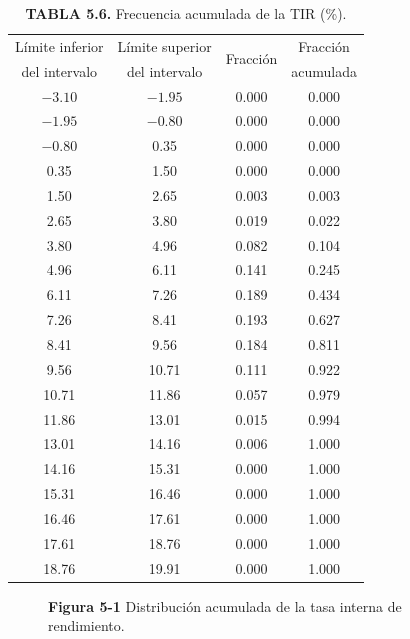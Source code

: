 \documentclass[11pt,letterpaper]{report}
\begin{document}
\begin{table}[H]
\centering
\caption*{\textbf{TABLA 5.6.} Frecuencia acumulada de la TIR (\%).}
\begin{tabular}{cccc}
\toprule
Límite inferior & Límite superior & \multirow{2}{*}{Fracción} & Fracción \\
del intervalo & del intervalo & & acumulada \\
\midrule
$-3.10$ & $-1.95$ & 0.000 & 0.000 \\
$-1.95$ & $-0.80$ & 0.000 & 0.000 \\
$-0.80$ &   0.35  & 0.000 & 0.000 \\
  0.35  &   1.50  & 0.000 & 0.000 \\
  1.50  &   2.65  & 0.003 & 0.003 \\
  2.65  &   3.80  & 0.019 & 0.022 \\
  3.80  &   4.96  & 0.082 & 0.104 \\
  4.96  &   6.11  & 0.141 & 0.245 \\
  6.11  &   7.26  & 0.189 & 0.434 \\
  7.26  &   8.41  & 0.193 & 0.627 \\
  8.41  &   9.56  & 0.184 & 0.811 \\
  9.56  &  10.71  & 0.111 & 0.922 \\
 10.71  &  11.86  & 0.057 & 0.979 \\
 11.86  &  13.01  & 0.015 & 0.994 \\
 13.01  &  14.16  & 0.006 & 1.000 \\
 14.16  &  15.31  & 0.000 & 1.000 \\
 15.31  &  16.46  & 0.000 & 1.000 \\
 16.46  &  17.61  & 0.000 & 1.000 \\
 17.61  &  18.76  & 0.000 & 1.000 \\
 18.76  &  19.91  & 0.000 & 1.000 \\
\bottomrule
\end{tabular}
\end{table}

\begin{figure}[H]
\centering
{}
\caption*{\textbf{Figura 5-1} Distribución acumulada de la tasa interna de rendimiento.}
\end{figure}
\end{document}
